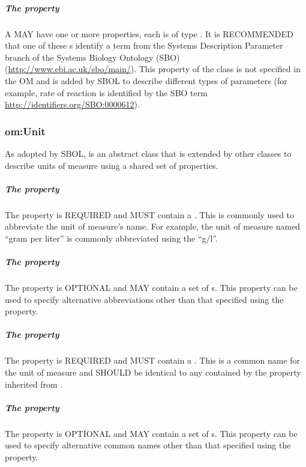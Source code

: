 \subparagraph{The  property}\label{sec:type:Measure}

A  MAY have one or more  properties, each is of type . It is RECOMMENDED that one of these s identify a term from the Systems Description Parameter branch of the Systems Biology Ontology (SBO) (\url{http://www.ebi.ac.uk/sbo/main/}). This  property of the  class is not specified in the OM and is added by SBOL to describe different types of parameters
(for example, rate of reaction is identified by the SBO term \url{http://identifiers.org/SBO:0000612}).

\subsubsection{om:Unit}
\label{sec:om:Unit}

As adopted by SBOL,  is an abstract class that is extended by other classes to describe units of measure using a shared set of properties.

\subparagraph{The  property}\label{sec:om:symbol:Unit}
The  property is REQUIRED and MUST contain a . This  is commonly used to abbreviate the unit of measure's name. For example, the unit of measure named ``gram per liter'' is commonly abbreviated using the  ``g/l''.

\subparagraph{The  property}\label{sec:om:alternativeSymbols:Unit}
The  property is OPTIONAL and MAY contain a set of s. This property can be used to specify alternative abbreviations other than that specified using the  property.

\subparagraph{The  property}\label{sec:om:label:Unit}
The  property is REQUIRED and MUST contain a . This  is a common name for the unit of measure and SHOULD be identical to any  contained by the  property inherited from .

\subparagraph{The  property}\label{sec:om:alternativeLabels:Unit}
The  property is OPTIONAL and MAY contain a set of s. This property can be used to specify alternative common names other than that specified using the  property.

